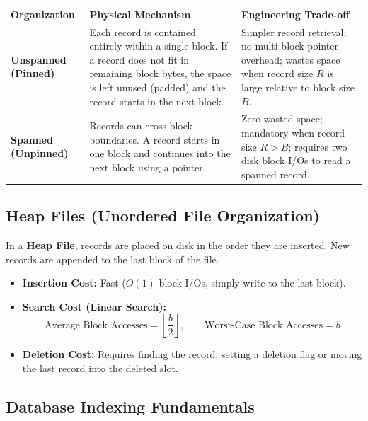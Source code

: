 \documentclass[11pt,a4paper]{article}
\begin{document}
\begin{center}
\small
\begin{tabularx}{\textwidth}{L{3.2cm} L{4.5cm} X}
  \color{white}\textbf{Organization} & \color{white}\textbf{Physical Mechanism} & \color{white}\textbf{Engineering Trade-off} \\
   \textbf{Unspanned (Pinned)} & Each record is contained entirely within a single block. If a record does not fit in remaining block bytes, the space is left unused (padded) and the record starts in the next block. & Simpler record retrieval; no multi-block pointer overhead; wastes space when record size $R$ is large relative to block size $B$. \\
  \textbf{Spanned (Unpinned)} & Records can cross block boundaries. A record starts in one block and continues into the next block using a pointer. & Zero wasted space; mandatory when record size $R > B$; requires two disk block I/Os to read a spanned record. \\
\end{tabularx}
\end{center}

\subsection{Heap Files (Unordered File Organization)}

In a \textbf{Heap File}, records are placed on disk in the order they are inserted. New records are appended to the last block of the file.
\begin{itemize}
  \item \textbf{Insertion Cost:} Fast ($O(1)$ block I/Os, simply write to the last block).
  \item \textbf{Search Cost (Linear Search):}
    \begin{equation}
      \text{Average Block Accesses} = \left\lfloor \frac{b}{2} \right\rfloor, \qquad \text{Worst-Case Block Accesses} = b
    \end{equation}
  \item \textbf{Deletion Cost:} Requires finding the record, setting a deletion flag or moving the last record into the deleted slot.
\end{itemize}

\subsection{Database Indexing Fundamentals}
\end{document}
